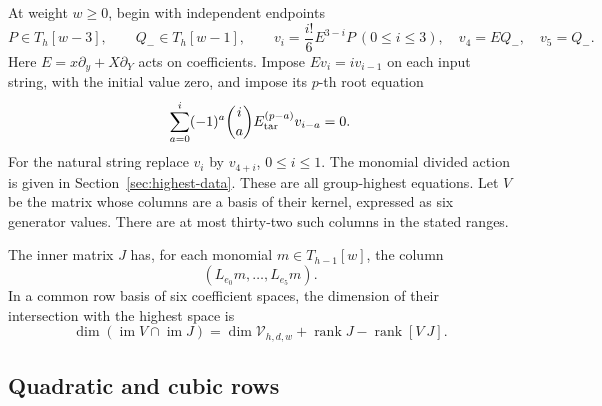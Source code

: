 \documentclass[11pt]{article}
\theoremstyle{plain}
\theoremstyle{definition}
\theoremstyle{remark}
\numberwithin{equation}{section}
\newcommand{\im}{\operatorname{im}}
\begin{document}
At weight \(w\ge0\), begin with independent endpoints
\[
 P\in T_h[w-3],\qquad Q_-\in T_h[w-1],
 \qquad v_i=\frac{i!}{6}E^{3-i}P\ (0\le i\le3),
 \quad v_4=EQ_-,\quad v_5=Q_-.
\]
Here \(E=x\partial_y+X\partial_Y\) acts on coefficients.
Impose \(Ev_i=iv_{i-1}\) on each input string, with the initial
value zero, and impose its \(p\)-th root equation
\[
 \sum_{a=0}^i(-1)^a\binom ia E_{\rm tar}^{(p-a)}v_{i-a}=0.
\]
For the natural string replace \(v_i\) by \(v_{4+i}\),
\(0\le i\le1\). The monomial divided action is given in
Section~\ref{sec:highest-data}. These are all group-highest equations.
Let \(V\) be the matrix whose columns are a basis of their kernel,
expressed as six generator values. There are at most thirty-two
such columns in the stated ranges.

The inner matrix \(J\) has, for each monomial
\(m\in T_{h-1}[w]\), the column
\[
 (L_{e_0}m,\ldots,L_{e_5}m).
\]
In a common row basis of six coefficient spaces,
the dimension of their intersection with the highest space is
\begin{equation}\label{eq:comparison-inner-intersection}
 \dim(\im V\cap\im J)
     =\dim\mathcal V_{h,d,w}+\operatorname{rank}J
                                    -\operatorname{rank}[V\ J].
\end{equation}

\subsection{Quadratic and cubic rows}
\end{document}
